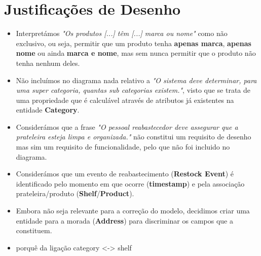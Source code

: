 \documentclass[12pt,a4paper]{article}
\begin{document}
  \section*{Justificações de Desenho}
  \begin{itemize}
    \item Interpretámos \textit{"Os produtos [...] têm [...] marca ou nome"}
      como não exclusivo, ou seja, permitir que um produto tenha \textbf{apenas marca},
      \textbf{apenas nome} ou ainda \textbf{marca e nome}, mas sem nunca
      permitir que o produto não tenha nenhum deles.
    \item Não incluímos no diagrama nada relativo a
      \textit{"O sistema deve determinar, para uma super categoria, quantas sub categorias existem."},
      visto que se trata de uma propriedade que é calculável através de
      atributos já existentes na entidade \textbf{Category}.
    \item Considerámos que a frase
      \textit{"O pessoal reabastecedor deve assegurar que a prateleira esteja limpa e organizada."}
      não constitui um requisito de desenho mas sim um requisito de funcionalidade,
      pelo que não foi incluido no diagrama.
    \item Considerámos que um evento de reabastecimento (\textbf{Restock Event}) é
      identificado pelo momento em que ocorre (\textbf{timestamp}) e pela associação
      prateleira/produto (\textbf{Shelf}/\textbf{Product}).
    \item Embora não seja relevante para a correção do modelo, decidimos criar uma
      entidade para a morada (\textbf{Address}) para discriminar os campos que a constituem.
    \item porquê da ligação category <-> shelf
  \end{itemize}
\end{document}
